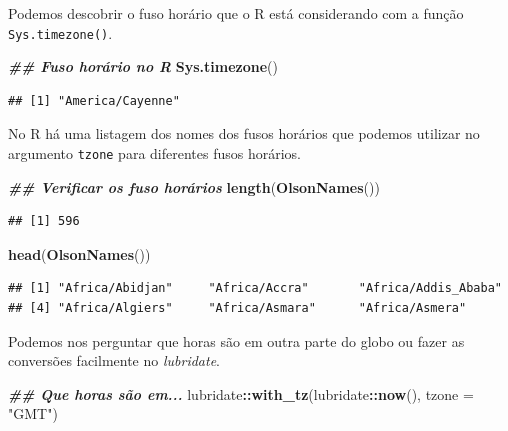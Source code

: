 \documentclass[
]{article}
\newenvironment{Shaded}{\begin{snugshade}}{\end{snugshade}}
\newcommand{\AttributeTok}[1]{\textcolor[rgb]{0.13,0.29,0.53}{#1}}
\newcommand{\DocumentationTok}[1]{\textcolor[rgb]{0.56,0.35,0.01}{\textbf{\textit{#1}}}}
\newcommand{\FunctionTok}[1]{\textcolor[rgb]{0.13,0.29,0.53}{\textbf{#1}}}
\newcommand{\NormalTok}[1]{#1}
\newcommand{\SpecialCharTok}[1]{\textcolor[rgb]{0.81,0.36,0.00}{\textbf{#1}}}
\newcommand{\StringTok}[1]{\textcolor[rgb]{0.31,0.60,0.02}{#1}}
\begin{document}
Podemos descobrir o fuso horário que o R está considerando com a função \texttt{Sys.timezone()}.

\begin{Shaded}
\begin{Highlighting}[]
\DocumentationTok{\#\# Fuso horário no R}
\FunctionTok{Sys.timezone}\NormalTok{()}
\end{Highlighting}
\end{Shaded}

\begin{verbatim}
## [1] "America/Cayenne"
\end{verbatim}

No R há uma listagem dos nomes dos fusos horários que podemos utilizar no argumento \texttt{tzone} para diferentes fusos horários.

\begin{Shaded}
\begin{Highlighting}[]
\DocumentationTok{\#\# Verificar os fuso horários}
\FunctionTok{length}\NormalTok{(}\FunctionTok{OlsonNames}\NormalTok{())}
\end{Highlighting}
\end{Shaded}

\begin{verbatim}
## [1] 596
\end{verbatim}

\begin{Shaded}
\begin{Highlighting}[]
\FunctionTok{head}\NormalTok{(}\FunctionTok{OlsonNames}\NormalTok{())}
\end{Highlighting}
\end{Shaded}

\begin{verbatim}
## [1] "Africa/Abidjan"     "Africa/Accra"       "Africa/Addis_Ababa"
## [4] "Africa/Algiers"     "Africa/Asmara"      "Africa/Asmera"
\end{verbatim}

Podemos nos perguntar que horas são em outra parte do globo ou fazer as conversões facilmente no \emph{lubridate}.

\begin{Shaded}
\begin{Highlighting}[]
\DocumentationTok{\#\# Que horas são em...}
\NormalTok{lubridate}\SpecialCharTok{::}\FunctionTok{with\_tz}\NormalTok{(lubridate}\SpecialCharTok{::}\FunctionTok{now}\NormalTok{(), }\AttributeTok{tzone =} \StringTok{"GMT"}\NormalTok{)}
\end{Highlighting}
\end{Shaded}
\end{document}
